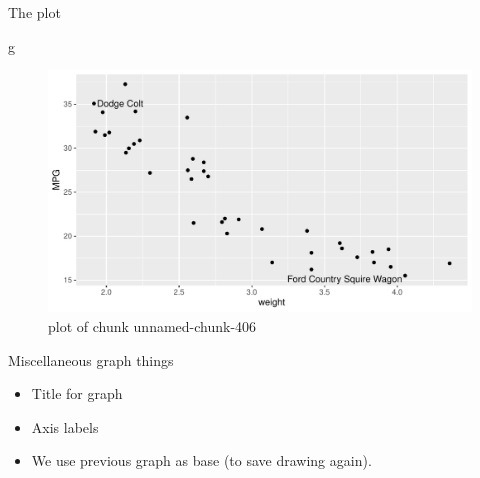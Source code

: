 \documentclass[
  ignorenonframetext,
]{beamer}
\newenvironment{Shaded}{\begin{snugshade}}{\end{snugshade}}
\newcommand{\NormalTok}[1]{#1}
\providecommand{\tightlist}{%
  \setlength{\itemsep}{0pt}\setlength{\parskip}{0pt}}
\begin{document}
\begin{frame}[fragile]{The plot}
\protect\hypertarget{the-plot-7}{}

\begin{Shaded}
\begin{Highlighting}[]
\NormalTok{g}
\end{Highlighting}
\end{Shaded}

\begin{figure}
\centering
\includegraphics{figure/unnamed-chunk-406-1.pdf}
\caption{plot of chunk unnamed-chunk-406}
\end{figure}

\end{frame}

\begin{frame}{Miscellaneous graph things}
\protect\hypertarget{miscellaneous-graph-things}{}

\begin{itemize}
\tightlist
\item
  Title for graph
\item
  Axis labels
\item
  We use previous graph as base (to save drawing again).
\end{itemize}

\end{frame}
\end{document}
